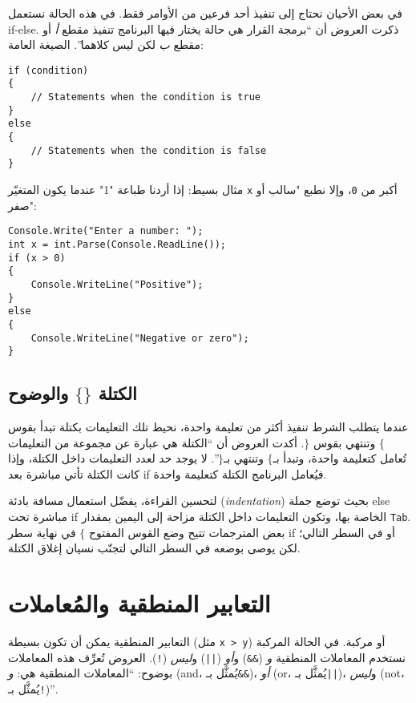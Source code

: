 ﻿\documentclass[12pt]{article}
\begin{document}
في بعض الأحيان نحتاج إلى تنفيذ أحد فرعين من الأوامر فقط. في هذه الحالة نستعمل \textenglish{if-else}. ذكرت العروض أن ``برمجة القرار هي حالة يختار فيها البرنامج تنفيذ مقطع \emph{أ} أو مقطع \emph{ب} لكن ليس كلاهما''. الصيغة العامة:

\begin{english}
\begin{verbatim}
if (condition)
{
    // Statements when the condition is true
}
else
{
    // Statements when the condition is false
}
\end{verbatim}
\end{english}

مثال بسيط: إذا أردنا طباعة "1" عندما يكون المتغيّر \texttt{x} أكبر من \texttt{0}، وإلا نطبع "سالب أو صفر":

\begin{english}
\begin{verbatim}
Console.Write("Enter a number: ");
int x = int.Parse(Console.ReadLine());
if (x > 0)
{
    Console.WriteLine("Positive");
}
else
{
    Console.WriteLine("Negative or zero");
}
\end{verbatim}
\end{english}

\subsection{الكتلة $\{\}$ والوضوح}

عندما يتطلب الشرط تنفيذ أكثر من تعليمة واحدة، نحيط تلك التعليمات بكتلة تبدأ بقوس $\{$ وتنتهي بقوس $\}$. أكدت العروض أن ``الكتلة هي عبارة عن مجموعة من التعليمات تُعامل كتعليمة واحدة، وتبدأ بـ$\{$ وتنتهي بـ$\}$''. لا يوجد حد لعدد التعليمات داخل الكتلة، وإذا كانت الكتلة تأتي مباشرة بعد \textenglish{if} فيُعامل البرنامج الكتلة كتعليمة واحدة.

لتحسين القراءة، يفضّل استعمال مسافة بادئة (\emph{indentation}) بحيث توضع جملة \textenglish{else} مباشرة تحت \textenglish{if} الخاصة بها، وتكون التعليمات داخل الكتلة مزاحة إلى اليمين بمقدار \texttt{Tab}. بعض المترجمات تتيح وضع القوس المفتوح $\{$ في نهاية سطر \textenglish{if} أو في السطر التالي؛ لكن يوصى بوضعه في السطر التالي لتجنّب نسيان إغلاق الكتلة.

\section{التعابير المنطقية والمُعاملات}

التعابير المنطقية يمكن أن تكون بسيطة (مثل \verb|x > y|) أو مركبة. في الحالة المركبة نستخدم المعاملات المنطقية \emph{و} (\texttt{\&\&}) و\emph{أو} (\texttt{||}) و\emph{ليس} (\texttt{!}). العروض تُعرِّف هذه المعاملات بوضوح: ``المعاملات المنطقية هي: \emph{و} (\textenglish{and}، يُمثَّل بـ\texttt{\&\&})، \emph{أو} (\textenglish{or}، يُمثَّل بـ\texttt{||})، و\emph{ليس} (\textenglish{not}، يُمثَّل بـ\texttt{!})''.
\end{document}
